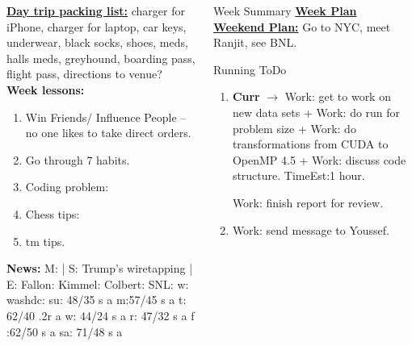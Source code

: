 \begin{columns}
\begin{column}{0.25\linewidth}
      \begin{block}
      
      {\underline{\bf Day trip packing list:} charger for iPhone,
        charger for laptop, car keys, underwear, black socks, shoes,
        meds, halls meds, greyhound, boarding pass, flight pass, directions to
        venue?} \\ 
      {\tiny {\bf Week lessons:}} \\ 
      \begin{enumerate}
        \tiny \item \tiny Win Friends/ Influence People – no one
        likes to take direct orders.
      \item \tiny Go through 7 habits.
      \item \tiny Coding problem: 
      \item \tiny Chess tips: 
      \item \tiny tm tips.
      \end{enumerate}
          {{\tiny {\bf News:}} M:  | S:  Trump's wiretapping  | E:
            Fallon:   Kimmel:  Colbert: SNL:
            w: washdc: 
            {su: {48/35 s a}}  
            {m:{57/45 s a}} 
            {t: {62/40 .2r a}} 
            {w: {44/24 s a}} 
            {r: {47/32 s a}} 
            {f :{62/50 s a} }
            {sa: {71/48 s a}}} 
    \end{block} 

  \end{column}
  \begin{column}{0.5\linewidth}
    \begin{block}{Week Summary} 
      {\underline {\bf Week Plan}  } \\ 
      {\underline{\bf Weekend Plan:} Go to NYC, meet Ranjit, see BNL.}\\

    \end{block}


      \begin{block}{Running ToDo} %
        \begin{enumerate}
        \item \tiny \textbf{Curr} $\rightarrow$
Work: get to work on new data sets + Work: do run for problem size +
Work: do transformations from CUDA to OpenMP 4.5 + Work: discuss code
structure. TimeEst:1 hour. 

Work: finish report for review.

\item \tiny Work: send message to Youssef.


\end{enumerate}
\end{block}
\end{column}
\end{columns}
